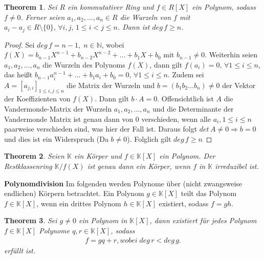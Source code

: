 \documentclass[12pt,oneside]{article}
\newtheorem{theorem}{Theorem}[section]
\theoremstyle{remark}
\theoremstyle{definition}
\begin{document}
\smallskip

\begin{theorem}\label{number_of_roots}
Sei $R$ ein kommutativer Ring und $f \in R[X]$ ein Polynom, sodass $f \neq 0$. Ferner seien $a_1, a_2,...,a_n \in R$ die Wurzeln von $f$ mit $a_i - a_j \in R\setminus\{0\} , \, \forall i,j, \, 1 \leq i < j \leq n$. Dann ist $deg \, f \geq n$.
\end{theorem}

\begin{proof}
Sei $deg \, f = n - 1, \; n \in \mathbb{N}$, wobei $f(X) = b_{n-1}X^{n-1} + b_{n-2}X^{n-2} + ... + b_1 X + b_0$ mit $b_{n-1} \neq 0$. Weiterhin seien $a_1,a_2,...,a_{n}$ die Wurzeln des Polynoms $f(X)$, dann gilt $f(a_i) = 0, \, \forall 1 \leq i \leq n$, das heißt $b_{n-1} a_i^{n-1} +...+ b_1 a_i + b_0 = 0, \, \forall 1 \leq i \leq n$. \newline\newline Zudem sei $A = [a_{j,i}]_{1 \leq i,j \leq n}$ die Matrix der Wurzeln und $b = (b_1 b_2 ...b_{n}) \neq 0$ der Vektor der Koeffizienten von $f(X)$. Dann gilt $b \cdot A = 0$. Offensichtlich ist $A$ die Vandermonde-Matrix der Wurzeln $a_1,a_2,...,a_{n}$ und die Determinante der Vandermonde Matrix ist genau dann von $0$ verschieden, wenn alle $a_{i}, 1 \leq i \leq n $ paarweise verschieden sind, was hier der Fall ist. Daraus folgt $det \, A \neq 0 \Rightarrow  b = 0$ und dies ist ein Widerspruch (Da $b \neq 0$). Folglich gilt $deg \, f \geq n$  
\end{proof}

\begin{theorem}\label{irred-poly-over-ext-fields}
Seien $\mathbb{K}$ ein Körper und $f \in \mathbb{K}[X]$ ein Polynom. Der Restklassenring $\mathbb{K}/f(X)$ ist genau dann ein Körper, wenn $f$ in $\mathbb{K}$ irreduzibel ist.\newline

\end{theorem}

\textbf{Polynomdivision}\newline
Im folgenden werden Polynome über (nicht zwangsweise endlichen) Körpern betrachtet. Ein Polynom $g \in \mathbb{K}[X]$ teilt das Polynom $f \in \mathbb{K}[X]$, wenn ein drittes Polynom $h \in \mathbb{K}[X]$ existiert, sodass $f = gh$.

\begin{theorem}\label{poly_div}
Sei $g \neq 0 $ ein Polynom in $\mathbb{K}[X]$, dann existiert für jedes Polynom $f \in \mathbb{K}[X]$ Polynome $q,r \in \mathbb{K}[X]$, sodass
\begin{align*}
    f = gq + r, wobei \; deg \,  r  < deg \,  g.
\end{align*}
erfüllt ist. 
\end{theorem}
\end{document}

